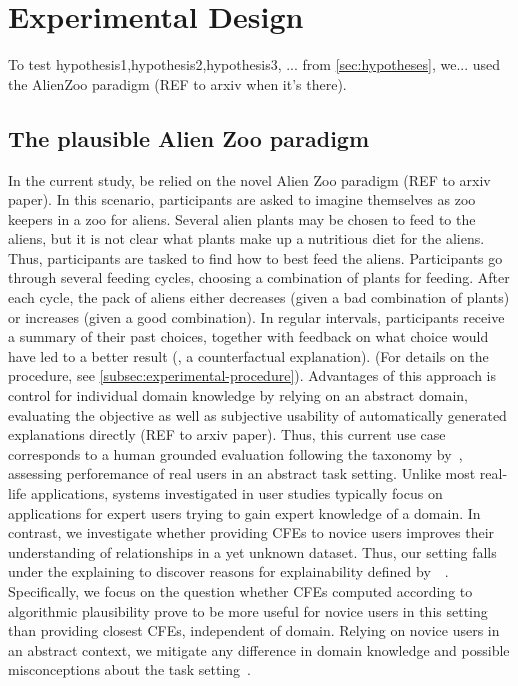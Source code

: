 \section{Experimental Design}\label{sec:experimental-design}
\textcolor{ACMDarkBlue}{
To test hypothesis1,hypothesis2,hypothesis3, ... from \ref{sec:hypotheses}, we... used the AlienZoo paradigm (REF to arxiv when it's there). 
}

\subsection{The plausible Alien Zoo paradigm}

\textcolor{ACMDarkBlue}{
In the current study, be relied on the novel Alien Zoo paradigm (REF to arxiv paper).
} \textcolor{ACMDarkBlue}{
In this scenario, participants are asked to imagine themselves as zoo keepers in a zoo for aliens. Several alien plants may be chosen to feed to the aliens, but it is not clear what plants make up a nutritious diet for the aliens. Thus, participants are tasked to find how to best feed the aliens.
Participants go through several feeding cycles, choosing a combination of plants for feeding. After each cycle, the pack of aliens either decreases (given a bad combination of plants) or increases (given a good combination). 
In regular intervals, participants receive a summary of their past choices, together with feedback on what choice would have led to a better result (\ie, a counterfactual explanation). 
(For details on the procedure, see \ref{subsec:experimental-procedure}).
} \textcolor{ACMDarkBlue}{
Advantages of this approach is control for individual domain knowledge by relying on an abstract domain, evaluating the objective as well as subjective usability of automatically generated explanations directly (REF to arxiv paper).
} \textcolor{ACMDarkBlue}{
Thus, this current use case corresponds to a human grounded evaluation following the taxonomy by~\citeauthor{doshi-velez_towards_2017}, assessing perforemance of real users in an abstract task setting.
} \textcolor{ACMDarkBlue}{
Unlike most real-life applications, systems investigated in user studies typically focus on applications for expert users trying to gain expert knowledge of a domain. 
In contrast, we investigate whether providing \glspl{CFE} to novice users improves their understanding of relationships in a yet unknown dataset. 
Thus, our setting falls under the explaining to discover reasons for explainability defined by~\citeauthor{adadi_peeking_2018}~\citep{adadi_peeking_2018}.
Specifically, we focus on the question whether \glspl{CFE} computed according to algorithmic plausibility prove to be more useful for novice users in this setting than providing closest \glspl{CFE}, independent of domain.
Relying on novice users in an abstract context, we mitigate any difference in domain knowledge and possible misconceptions about the task setting~\citep{van_der_waa_evaluating_2021}.
}

